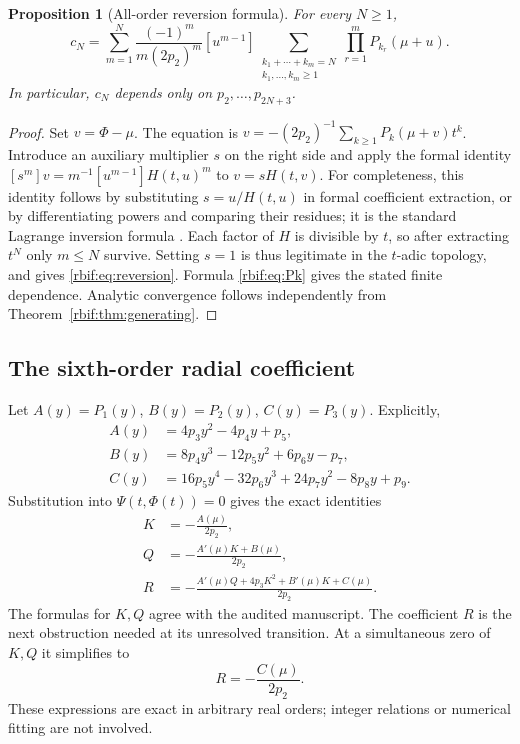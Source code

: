 \documentclass[11pt,a4paper]{article}
\newtheorem{proposition}[theorem]{Proposition}
\theoremstyle{definition}\newtheorem{definition}[theorem]{Definition}
\theoremstyle{remark}\newtheorem{remark}[theorem]{Remark}
\numberwithin{equation}{section}
\begin{document}
\begin{proposition}[All-order reversion formula]
\label{rbif:prop:reversion}
For every $N\ge1$,
\begin{equation}
 c_N=\sum_{m=1}^N\frac{(-1)^m}{m(2p_2)^m}
 [u^{m-1}]\!
 \sum_{\substack{k_1+\cdots+k_m=N\\k_1,\ldots,k_m\ge1}}
       \prod_{r=1}^m P_{k_r}(\mu+u).
 \label{rbif:eq:reversion}
\end{equation}
In particular, $c_N$ depends only on $p_2,\ldots,p_{2N+3}$.
\end{proposition}
\begin{proof}
Set $v=\Phi-\mu$. The equation is
$v=-(2p_2)^{-1}\sum_{k\ge1}P_k(\mu+v)t^k$.
Introduce an auxiliary multiplier $s$ on the right side and apply the
formal identity
$[s^m]v=m^{-1}[u^{m-1}]H(t,u)^m$ to $v=sH(t,v)$.
For completeness, this identity follows by substituting
$s=u/H(t,u)$ in formal coefficient extraction, or by differentiating
powers and comparing their residues; it is the standard Lagrange
inversion formula \cite{rbif:gessel}. Each factor of $H$ is divisible
by $t$, so after extracting $t^N$ only $m\le N$ survive. Setting $s=1$
is thus legitimate in the $t$-adic topology, and gives
\eqref{rbif:eq:reversion}. Formula \eqref{rbif:eq:Pk} gives the stated
finite dependence. Analytic convergence follows independently from
Theorem~\ref{rbif:thm:generating}.
\end{proof}

\subsection{The sixth-order radial coefficient}
Let $A(y)=P_1(y)$, $B(y)=P_2(y)$, $C(y)=P_3(y)$. Explicitly,
\begin{align}
 A(y)&=4p_3y^2-4p_4y+p_5,\label{rbif:eq:ABC1}\\
 B(y)&=8p_4y^3-12p_5y^2+6p_6y-p_7,\\
 C(y)&=16p_5y^4-32p_6y^3+24p_7y^2-8p_8y+p_9.
 \label{rbif:eq:ABC3}
\end{align}
Substitution into $\Psi(t,\Phi(t))=0$ gives the exact identities
\begin{align}
 K&=-\frac{A(\mu)}{2p_2},\label{rbif:eq:K}\\
 Q&=-\frac{A'(\mu)K+B(\mu)}{2p_2},\label{rbif:eq:Q}\\
 R&=-\frac{A'(\mu)Q+4p_3K^2+B'(\mu)K+C(\mu)}{2p_2}.
 \label{rbif:eq:R}
\end{align}
The formulas for $K,Q$ agree with the audited manuscript. The coefficient
$R$ is the next obstruction needed at its unresolved transition.
At a simultaneous zero of $K,Q$ it simplifies to
\begin{equation}
 R=-\frac{C(\mu)}{2p_2}.
 \label{rbif:eq:Rdeg}
\end{equation}
These expressions are exact in arbitrary real orders; integer relations
or numerical fitting are not involved.
\end{document}
